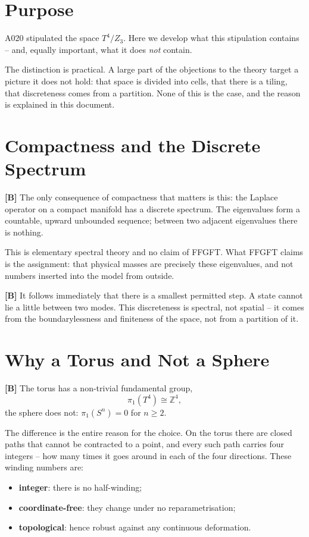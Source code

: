 \section{Purpose}

A020 stipulated the space $T^4/Z_3$. Here we develop what this stipulation
contains -- and, equally important, what it does \emph{not} contain.

The distinction is practical. A large part of the objections to the theory
target a picture it does not hold: that space is divided into cells, that
there is a tiling, that discreteness comes from a partition. None of this is
the case, and the reason is explained in this document.

\section{Compactness and the Discrete Spectrum}

\textbf{[B]} The only consequence of compactness that matters is this: the
Laplace operator on a compact manifold has a discrete spectrum. The eigenvalues
form a countable, upward unbounded sequence; between two adjacent eigenvalues
there is nothing.

This is elementary spectral theory and no claim of FFGFT. What FFGFT claims
is the assignment: that physical masses are precisely these eigenvalues, and
not numbers inserted into the model from outside.

\textbf{[B]} It follows immediately that there is a smallest permitted step.
A state cannot lie a little between two modes. This discreteness is spectral,
not spatial -- it comes from the boundarylessness and finiteness of the space,
not from a partition of it.

\section{Why a Torus and Not a Sphere}

\textbf{[B]} The torus has a non-trivial fundamental group,
\[
  \pi_1(T^4) \cong \mathbb{Z}^4 ,
\]
the sphere does not: $\pi_1(S^n) = 0$ for $n\geq 2$.

The difference is the entire reason for the choice. On the torus there are
closed paths that cannot be contracted to a point, and every such path carries
four integers -- how many times it goes around in each of the four directions.
These winding numbers are:

\begin{itemize}
  \item \textbf{integer}: there is no half-winding;
  \item \textbf{coordinate-free}: they change under no reparametrisation;
  \item \textbf{topological}: hence robust against any continuous deformation.
\end{itemize}

